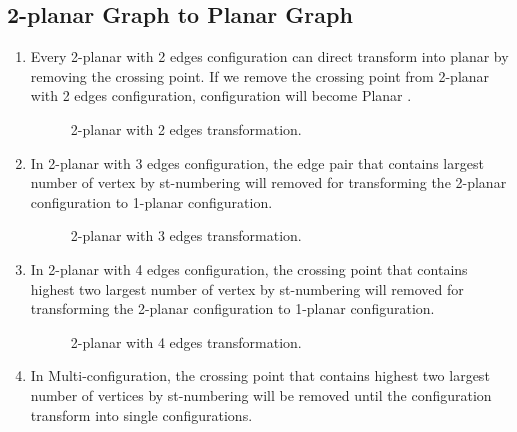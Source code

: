 \subsection{2-planar Graph to Planar Graph}
\label{2pgtpg}
\begin{enumerate}



\item Every 2-planar with 2 edges configuration can direct transform into planar by removing the crossing point. If we remove the crossing point from 2-planar with 2 edges configuration, configuration will become Planar .




\begin{figure}[!tb]
\centering
\resizebox{50mm}{!}{}
\caption{2-planar with 2 edges transformation.}
\label{fig:2planar2edges}
\end{figure}

\item 
In 2-planar with 3 edges configuration, the edge pair that contains largest number of vertex by st-numbering will removed for transforming the 2-planar configuration to 1-planar configuration.



\begin{figure}[!tb]
\centering
\resizebox{150mm}{!}{}
\caption{2-planar with 3 edges transformation.}
\label{fig:2planar3edges}
\end{figure}


\item In 2-planar with 4 edges configuration, the crossing point that contains highest two largest number of vertex by st-numbering will removed for transforming the 2-planar configuration to 1-planar configuration.



\begin{figure}[!tb]
\centering
\resizebox{150mm}{!}{}
\caption{2-planar with 4 edges transformation.}
\label{fig:2planar4edges}
\end{figure}


\item 
In Multi-configuration, the crossing point that contains highest two largest number of vertices by st-numbering will be removed until the configuration transform into single configurations.


\end{enumerate}
